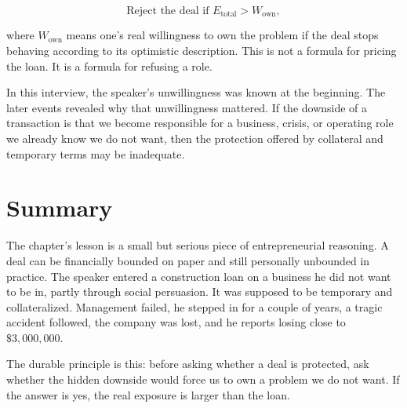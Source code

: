 \begin{equation}
\text{Reject the deal if }
E_{\text{total}}
>
W_{\text{own}},
\end{equation}

where \(W_{\text{own}}\) means one's real willingness to own the problem if the deal stops behaving according to its optimistic description. This is not a formula for pricing the loan. It is a formula for refusing a role.

In this interview, the speaker's unwillingness was known at the beginning. The later events revealed why that unwillingness mattered. If the downside of a transaction is that we become responsible for a business, crisis, or operating role we already know we do not want, then the protection offered by collateral and temporary terms may be inadequate.

\section{Summary}

The chapter's lesson is a small but serious piece of entrepreneurial reasoning. A deal can be financially bounded on paper and still personally unbounded in practice. The speaker entered a construction loan on a business he did not want to be in, partly through social persuasion. It was supposed to be temporary and collateralized. Management failed, he stepped in for a couple of years, a tragic accident followed, the company was lost, and he reports losing close to \( \$3{,}000{,}000 \).

The durable principle is this: before asking whether a deal is protected, ask whether the hidden downside would force us to own a problem we do not want. If the answer is yes, the real exposure is larger than the loan.